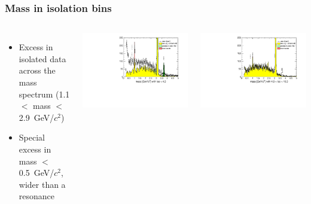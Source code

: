 \documentclass[compress]{beamer}
\begin{document}
\begin{frame}
\frametitle{Mass in isolation bins}

\begin{columns}
\begin{itemize}
\item Excess in isolated data across the mass spectrum (1.1 $<$ mass $<$ 2.9~GeV/$c^2$)
\item Special excess in mass $<$ 0.5~GeV/$c^2$, wider than a resonance
\end{itemize}

\includegraphics[width=\linewidth]{lowdimuon_mass_isolated.pdf}

\includegraphics[width=\linewidth]{lowdimuon_mass_isosideband.pdf}


\end{columns}
\end{frame}
\end{document}

